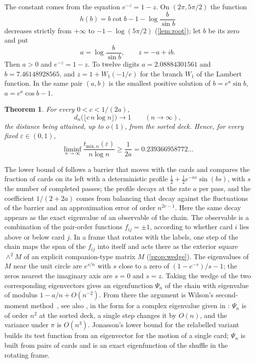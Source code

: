 \documentclass[11pt,a4paper]{article}
\numberwithin{equation}{section}
\newtheorem{theorem}{Theorem}[section]
\theoremstyle{remark}
\newcommand{\eps}{\varepsilon}
\begin{document}
The constant comes from the equation $e^{-z}=1-z$. On $(2\pi,5\pi/2)$ the function
\[
h(b)=b\cot b-1-\log\frac b{\sin b}
\]
decreases strictly from $+\infty$ to $-1-\log(5\pi/2)$ (\cref{lem:root}); let $b$ be its zero and put
\begin{equation}\label{eq:az}
a=\log\frac b{\sin b},\qquad z=-a+ib .
\end{equation}
Then $a>0$ and $e^{-z}=1-z$. To twelve digits $a=2.08884301561$ and $b=7.46148928565$, and $z=1+W_{1}(-1/e)$ for the branch $W_1$ of the Lambert function. In \cite{MNP} the same pair $(a,b)$ is the smallest positive solution of $b=e^a\sin b$, $a=e^a\cos b-1$.

\begin{theorem}\label{thm:main}
For every $0<c<1/(2a)$,
\[
d_n\bigl(\lfloor c\,n\log n\rfloor\bigr)\to1\qquad(n\to\infty),
\]
the distance being attained, up to $o(1)$, from the sorted deck. Hence, for every fixed $\eps\in(0,1)$,
\[
\liminf_{n\to\infty}\frac{t_{\mathrm{mix},n}(\eps)}{n\log n}\ge\frac1{2a}=0.239366958772\dots
\]
\end{theorem}

The lower bound of \cite{MNP} follows a barrier that moves with the cards and compares the fraction of cards on its left with a deterministic profile $\tfrac12+\tfrac12e^{-as}\sin(bs)$, with $s$ the number of completed passes; the profile decays at the rate $a$ per pass, and the coefficient $1/(2+2a)$ comes from balancing that decay against the fluctuations of the barrier and an approximation error of order $n^{2c-1}$. Here the same decay appears as the exact eigenvalue of an observable of the chain. The observable is a combination of the pair-order functions $f_{ij}=\pm1$, according to whether card $i$ lies above or below card $j$. In a frame that rotates with the labels, one step of the chain maps the span of the $f_{ij}$ into itself and acts there as the exterior square $\wedge^2M$ of an explicit companion-type matrix $M$ (\cref{prop:wedge}). The eigenvalues of $M$ near the unit circle are $e^{s/n}$ with $s$ close to a zero of $(1-e^{-s})/s-1$; the zeros nearest the imaginary axis are $s=0$ and $s=z$. Taking the wedge of the two corresponding eigenvectors gives an eigenfunction $\Psi_n$ of the chain with eigenvalue of modulus $1-a/n+O(n^{-2})$. From there the argument is Wilson's second-moment method~\cite{Wil}, see also \cite[Chapter~13]{LP}, in the form for a complex eigenvalue given in \cite[Lemma~2]{Wil03}: $\Psi_n$ is of order $n^2$ at the sorted deck, a single step changes it by $O(n)$, and the variance under $\pi$ is $O(n^3)$. Jonasson's lower bound for the relabelled variant~\cite{Jon} builds its test function from an eigenvector for the motion of a single card; $\Psi_n$ is built from pairs of cards and is an exact eigenfunction of the shuffle in the rotating frame.
\end{document}

